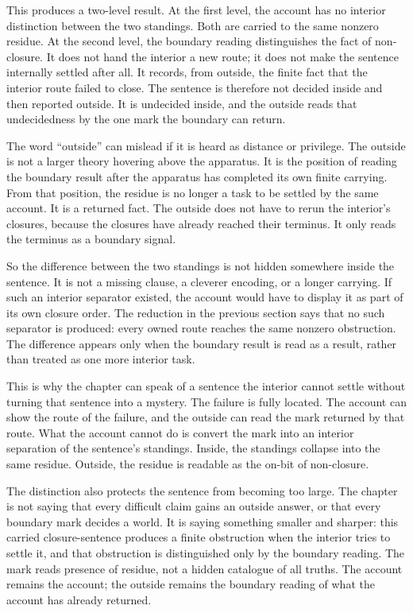 This produces a two-level result. At the first level, the account has no interior distinction
between the two standings. Both are carried to the same nonzero residue. At the second level,
the boundary reading distinguishes the fact of non-closure. It does not hand the interior a new
route; it does not make the sentence internally settled after all. It records, from outside, the
finite fact that the interior route failed to close. The sentence is therefore not decided
inside and then reported outside. It is undecided inside, and the outside reads that
undecidedness by the one mark the boundary can return.

The word ``outside'' can mislead if it is heard as distance or privilege. The outside is not a
larger theory hovering above the apparatus. It is the position of reading the boundary result
after the apparatus has completed its own finite carrying. From that position, the residue is no
longer a task to be settled by the same account. It is a returned fact. The outside does not
have to rerun the interior's closures, because the closures have already reached their terminus.
It only reads the terminus as a boundary signal.

So the difference between the two standings is not hidden somewhere inside the sentence. It is
not a missing clause, a cleverer encoding, or a longer carrying. If such an interior separator
existed, the account would have to display it as part of its own closure order. The reduction in
the previous section says that no such separator is produced: every owned route reaches the
same nonzero obstruction. The difference appears only when the boundary result is read as a
result, rather than treated as one more interior task.

This is why the chapter can speak of a sentence the interior cannot settle without turning that
sentence into a mystery. The failure is fully located. The account can show the route of the
failure, and the outside can read the mark returned by that route. What the account cannot do is
convert the mark into an interior separation of the sentence's standings. Inside, the standings
collapse into the same residue. Outside, the residue is readable as the on-bit of non-closure.

The distinction also protects the sentence from becoming too large. The chapter is not saying
that every difficult claim gains an outside answer, or that every boundary mark decides a world.
It is saying something smaller and sharper: this carried closure-sentence produces a finite
obstruction when the interior tries to settle it, and that obstruction is distinguished only by
the boundary reading. The mark reads presence of residue, not a hidden catalogue of all truths.
The account remains the account; the outside remains the boundary reading of what the account
has already returned.

